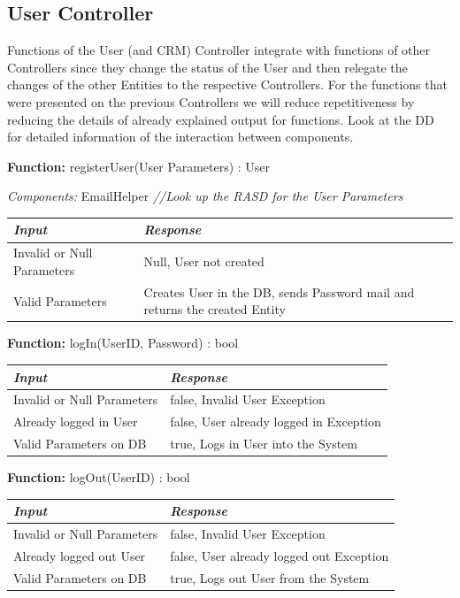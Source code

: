 \documentclass[a4paper]{article}
\begin{document}
\subsection{User Controller}
Functions of the User (and CRM) Controller integrate with functions of other Controllers since they change the status of the User and then relegate the changes of the other Entities to the respective Controllers. For the functions that were presented on the previous Controllers we will reduce repetitiveness by reducing the details of already explained output for functions. Look at the DD for detailed information of the interaction between components. \par
\textbf{Function:} registerUser(User Parameters) : User \par
\textit{Components:} EmailHelper
\textit{//Look up the RASD for the User Parameters}
\begin{center}
\begin{tabular}{ | L{6cm} | L{6cm} | }
\hline
	\textit{Input}& \textit{Response}\\ \hline
	Invalid or Null Parameters & Null, User not created \\ \hline
	Valid Parameters & Creates User in the DB, sends Password mail and returns the created Entity\\ \hline
\end{tabular}
\end{center}
\textbf{Function:} logIn(UserID, Password) : bool \par
\begin{center}
\begin{tabular}{ | L{6cm} | L{6cm} | }
\hline
	\textit{Input}& \textit{Response}\\ \hline
	Invalid or Null Parameters & false, Invalid User Exception\\ \hline
	Already logged in User & false, User already logged in Exception\\ \hline
	Valid Parameters on DB & true, Logs in User into the System \\ \hline
\end{tabular}
\end{center}
\textbf{Function:} logOut(UserID) : bool \par
\begin{center}
\begin{tabular}{ | L{6cm} | L{6cm} | }
\hline
	\textit{Input}& \textit{Response}\\ \hline
	Invalid or Null Parameters & false, Invalid User Exception\\ \hline
	Already logged out User & false, User already logged out Exception\\ \hline
	Valid Parameters on DB & true, Logs out User from the System \\ \hline
\end{tabular}
\end{center}
\end{document}
